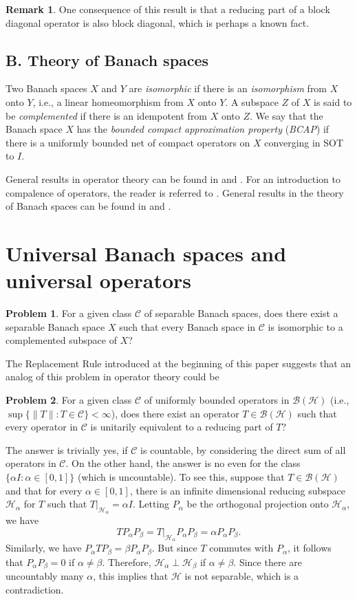 \documentclass[11pt]{amsart}
\theoremstyle{definition}
\newtheorem{problem}{Problem}
\newtheorem*{remark}{Remark}
\numberwithin{equation}{section}
\begin{document}
\begin{remark}
One consequence of this result is that a reducing part of a block diagonal operator is also block diagonal, which is perhaps a known fact.
\end{remark}
\subsection*{B. Theory of Banach spaces}
Two Banach spaces $X$ and $Y$ are {\it isomorphic} if there is an {\it isomorphism} from $X$ onto $Y$, i.e., a linear homeomorphism from $X$ onto $Y$. A subspace $Z$ of
$X$ is said to be {\it complemented} if there is an idempotent  from $X$ onto $Z$. We say that the Banach space $X$ has the {\it bounded compact approximation property}
({\it BCAP}) if there is a uniformly bounded net of compact operators on $X$ converging in SOT to $I$.

General results in operator theory can be found in \cite{Douglas} and \cite{Radjavi}. For an introduction to compalence of operators, the reader is referred to
\cite{Pearcy}. General results in the theory of Banach spaces can be found in \cite{LinTza} and \cite{Diestel}.
\section{Universal Banach spaces and universal operators}\label{2}
\begin{problem}\label{21p}
For a given class $\mathcal{C}$ of separable Banach spaces, does there exist a separable Banach space $X$ such that every Banach space in $\mathcal{C}$ is isomorphic to a
complemented subspace of $X$?
\end{problem}
The Replacement Rule introduced at the beginning of this paper suggests that an analog of this problem in operator theory could be
\begin{problem}\label{22p}
For a given class $\mathcal{C}$ of uniformly bounded operators in $\mathcal{B(H)}$ (i.e., $\sup\{\|T\|:T\in\mathcal{C}\}<\infty$), does there exist an operator $T\in
\mathcal{B(H)}$ such that every operator in $\mathcal{C}$ is unitarily equivalent to a reducing part of $T$?
\end{problem}
The answer is trivially yes, if $\mathcal{C}$ is countable, by considering the direct sum of all operators in $\mathcal{C}$. On the other hand, the answer is no even
for the class $\{\alpha I:\alpha\in [0,1]\}$ (which is uncountable). To see this, suppose that $T\in\mathcal{B(H)}$ and that for every $\alpha\in [0,1]$, there is an
infinite dimensional reducing subspace $\mathcal{H}_{\alpha}$ for $T$ such that $T|_{\mathcal{H}_{\alpha}}=\alpha I$. Letting $P_{\alpha}$ be the orthogonal projection
onto $\mathcal{H}_{\alpha}$, we have
\[TP_{\alpha}P_{\beta}=T|_{\mathcal{H}_{\alpha}}P_{\alpha}P_{\beta}=\alpha P_{\alpha}P_{\beta}.\]
Similarly, we have $P_{\alpha}TP_{\beta}=\beta P_{\alpha}P_{\beta}$. But since $T$ commutes with $P_{\alpha}$, it follows that $P_{\alpha}P_{\beta}=0$ if $\alpha\neq
\beta$. Therefore, $\mathcal{H}_{\alpha}\perp\mathcal{H}_{\beta}$ if $\alpha\neq\beta$. Since there are uncountably many $\alpha$, this implies that $\mathcal{H}$ is not
separable, which is a contradiction.
\end{document}
